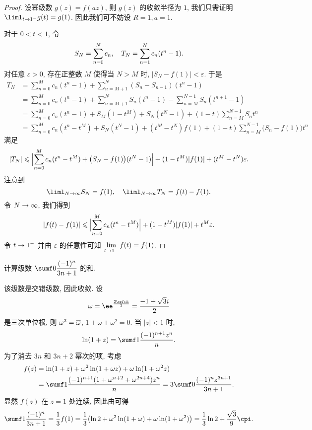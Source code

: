 \begin{proof}
  设幂级数 $g(z)=f(az)$, 则 $g(z)$ 的收敛半径为 $1$, 我们只需证明 $\liml_{t\ra 1^-} g(t)=g(1)$.
  因此我们可不妨设 $R=1,a=1$.

  对于 $0<t<1$, 令
  \[
    S_N=\suml_{n=0}^N c_n,\quad 
    T_N=\suml_{n=1}^N c_n(t^n-1).
  \]
  对任意 $\varepsilon>0$, 存在正整数 $M$ 使得当 $N>M$ 时, $|S_N-f(1)|<\varepsilon$.
  于是
  \begin{align*}
     T_N&
    =\sum_{n=0}^M c_n(t^n-1)+\sum_{n=M+1}^N(S_n-S_{n-1})(t^n-1)\\&
    =\sum_{n=0}^M c_n(t^n-1)+\sum_{n=M+1}^NS_n(t^n-1)-\sum_{n=M}^{N-1}S_n(t^{n+1}-1)\\&
    =\sum_{n=0}^M c_n(t^n-1)+S_M(1-t^M)+S_N(t^N-1)+(1-t)\sum_{n=M}^{N-1}S_nt^n\\&
    =\sum_{n=0}^M c_n(t^n-t^M)+S_N(t^N-1)+(t^M-t^N)f(1)+(1-t)\sum_{n=M}^{N-1}\bigl(S_n-f(1)\bigr)t^n
  \end{align*}
  满足
  \[
    |T_N|\le \Bigl|\sum_{n=0}^M c_n(t^n-t^M)+\bigl(S_N-f(1)\bigr)(t^N-1)\Bigr|+(1-t^M)|f(1)|+(t^M-t^N)\varepsilon.
  \]
  注意到
  \[
    \liml_{N\ra\infty} S_N=f(1),\quad \liml_{N\ra\infty} T_N=f(t)-f(1).
  \]
  令 $N\ra\infty$, 我们得到
  \[
    |f(t)-f(1)|\le \Bigl|\sum_{n=0}^M c_n(t^n-t^M)\Bigr|+(1-t^M)|f(1)|+t^M \varepsilon.
  \]
  令 $t\ra1^-$ 并由 $\varepsilon$ 的任意性可知 $\lim\limits_{t\ra 1^-}f(t)=f(1)$.
\end{proof}

\begin{example}
  计算级数 $\sumf0 \dfrac{(-1)^n}{3n+1}$ 的和.
\end{example}

\begin{solution}
  该级数是交错级数, 因此收敛.
  设
  \[
    \omega=\ee^{\frac{2\cpi\ii}3}=\frac{-1+\sqrt 3i}2
  \]
  是三次单位根, 则 $\omega^2=\ov\omega$, $1+\omega+\omega^2=0$.
  当 $|z|<1$ 时,
  \[
    \ln(1+z)=\sumf1 \frac{(-1)^{n+1}z^n}{n}.
  \]
  为了消去 $3n$ 和 $3n+2$ 幂次的项, 考虑
  \begin{align*}
    f(z)&=\ln(1+z)+\omega^2\ln(1+\omega z)+\omega\ln(1+\omega^2 z)\\
    &=\sumf1 \frac{(-1)^{n+1}(1+\omega^{n+2}+\omega^{2n+4})z^n}{n}
    =3\sumf0 \frac{(-1)^n z^{3n+1}}{3n+1}.
  \end{align*}
  显然 $f(z)$ 在 $z=1$ 处连续, 因此由\thmAS 可得
  \[
     \sumf1 \dfrac{(-1)^n}{3n+1}
    =\frac13 f(1)
    =\frac13\bigl(\ln2+\omega^2\ln(1+\omega)+\omega\ln(1+\omega^2)\bigr)
    =\frac13\ln2+\frac{\sqrt3}9\cpi.
  \]
\end{solution}



